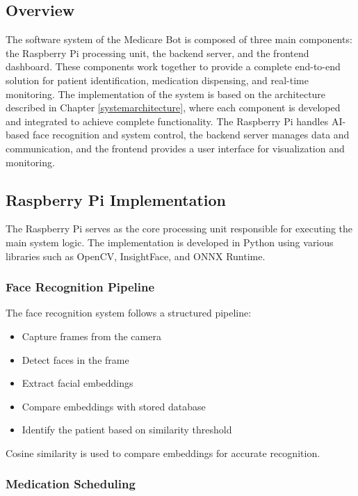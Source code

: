 
\subsection{Overview}

The software system of the Medicare Bot is composed of three main components: the Raspberry Pi processing unit, the backend server, and the frontend dashboard. These components work together to provide a complete end-to-end solution for patient identification, medication dispensing, and real-time monitoring.
The implementation of the system is based on the architecture described in Chapter \ref{systemarchitecture}, where each component is developed and integrated to achieve complete functionality.
The Raspberry Pi handles AI-based face recognition and system control, the backend server manages data and communication, and the frontend provides a user interface for visualization and monitoring.

\subsection{Raspberry Pi Implementation}

The Raspberry Pi serves as the core processing unit responsible for executing the main system logic. The implementation is developed in Python using various libraries such as OpenCV, InsightFace, and ONNX Runtime.

\subsubsection{Face Recognition Pipeline}

The face recognition system follows a structured pipeline:

\begin{itemize}
    \item Capture frames from the camera
    \item Detect faces in the frame
    \item Extract facial embeddings
    \item Compare embeddings with stored database
    \item Identify the patient based on similarity threshold
\end{itemize}

Cosine similarity is used to compare embeddings for accurate recognition.

\subsubsection{Medication Scheduling}

